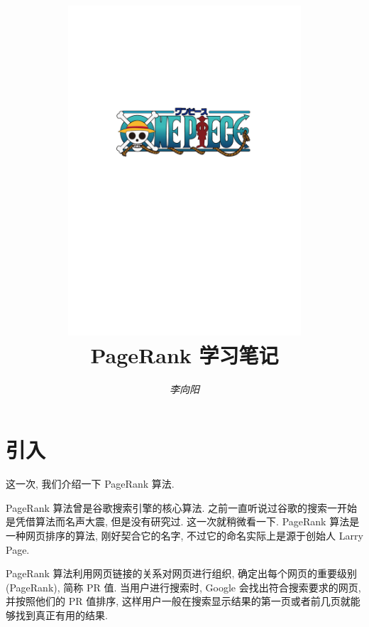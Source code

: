 \documentclass[a4paper,UTF8]{ctexart}
\theoremstyle{plain} \newtheorem{theorem}{定理}[section]
\theoremstyle{plain} \newtheorem{definition}{定义}[section]
\theoremstyle{plain} \newtheorem{lemma}{引理}[section]
\theoremstyle{plain} \newtheorem{proposition}{命题}[section]
\theoremstyle{plain} \newtheorem{example}{例}[section]
\theoremstyle{plain} \newtheorem{remark}{注}[section]
\theoremstyle{plain} \newtheorem{corollary}{推论}[section]
\begin{document}
\title{
\includegraphics[width=0.65\textwidth]{onepiece.pdf}\\
\vspace{2em}
\textbf{PageRank 学习笔记}}
\author{\emph{李向阳} 
}
\date{}


\maketitle
\thispagestyle{empty}

\newpage


\tableofcontents

\newpage

\section{引入}
这一次, 我们介绍一下 PageRank 算法.

PageRank 算法曾是谷歌搜索引擎的核心算法. 之前一直听说过谷歌的搜索一开始是凭借算法而名声大震, 但是没有研究过. 这一次就稍微看一下. PageRank 算法是一种网页排序的算法, 刚好契合它的名字, 不过它的命名实际上是源于创始人 Larry Page.

PageRank 算法利用网页链接的关系对网页进行组织, 确定出每个网页的重要级别(PageRank), 简称 PR 值. 当用户进行搜索时, Google 会找出符合搜索要求的网页, 并按照他们的 PR 值排序, 这样用户一般在搜索显示结果的第一页或者前几页就能够找到真正有用的结果.
\end{document}
